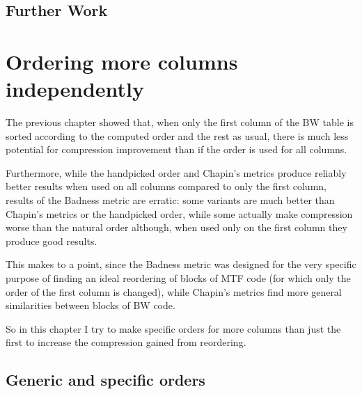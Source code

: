 \documentclass[a4paper]{scrreprt}
\begin{document}

\section{Further Work}


\chapter{Ordering more columns independently}


The previous chapter showed that, when only the first column of the BW table is
sorted according to the computed order and the rest as usual, there is much less
potential for compression improvement than if the order is used for all columns.

Furthermore, while the handpicked order and Chapin's metrics produce reliably
better results when used on all columns compared to only the first column,
results of the Badness metric are erratic: some variants are much better than
Chapin's metrics or the handpicked order, while some actually make compression
worse than the natural order although, when used only on the first column they
produce good results.

This makes to a point, since the Badness metric was designed for the very
specific purpose of finding an ideal reordering of blocks of MTF code (for
which only the order of the first column is changed), while Chapin's metrics
find more general similarities between blocks of BW code.

So in this chapter I try to make specific orders for more columns than just the
first to increase the compression gained from reordering.

\section{Generic and specific orders}
\end{document}
